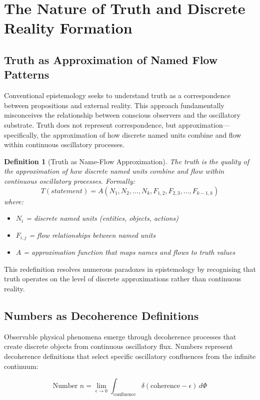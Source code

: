 \documentclass[12pt,a4paper]{article}
\newtheorem{definition}{Definition}
\begin{document}
\section{The Nature of Truth and Discrete Reality Formation}

\subsection{Truth as Approximation of Named Flow Patterns}

Conventional epistemology seeks to understand truth as a correspondence between propositions and external reality. This approach fundamentally misconceives the relationship between conscious observers and the oscillatory substrate. Truth does not represent correspondence, but approximation—specifically, the approximation of how discrete named units combine and flow within continuous oscillatory processes.

\begin{definition}[Truth as Name-Flow Approximation]
The truth is the quality of the approximation of how discrete named units combine and flow within continuous oscillatory processes. Formally:
$$T(statement) = A(N_1, N_2, \ldots, N_k, F_{1,2}, F_{2,3}, \ldots, F_{k-1,k})$$
where:
\begin{itemize}
\item $N_i$ = discrete named units (entities, objects, actions)
\item $F_{i,j}$ = flow relationships between named units
\item $A$ = approximation function that maps names and flows to truth values
\end{itemize}
\end{definition}

This redefinition resolves numerous paradoxes in epistemology by recognising that truth operates on the level of discrete approximations rather than continuous reality.

\subsection{Numbers as Decoherence Definitions}

Observable physical phenomena emerge through decoherence processes that create discrete objects from continuous oscillatory flux. Numbers represent decoherence definitions that select specific oscillatory confluences from the infinite continuum:

$$\text{Number }n = \lim_{\epsilon \to 0} \int_{\text{confluence}} \delta(\text{coherence} - \epsilon) \, d\Phi$$
\end{document}
